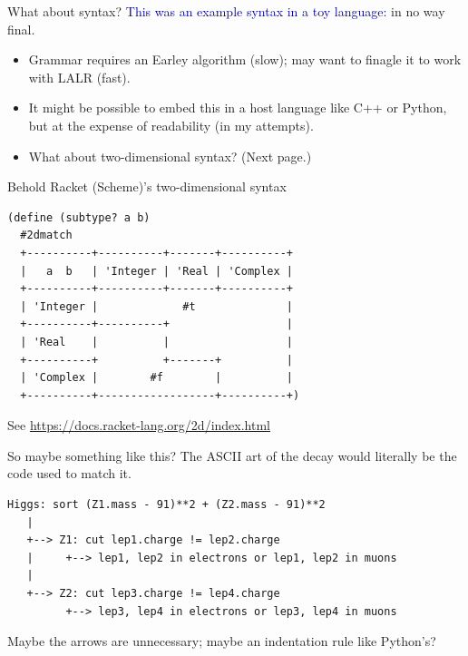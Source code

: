 \documentclass[aspectratio=169]{beamer}
\begin{document}
\begin{frame}{What about syntax?}
\Large
\vspace{0.5 cm}
\textcolor{darkblue}{This was an example syntax in a toy language:} in no way final.

\large
\vspace{0.5 cm}
\begin{itemize}\setlength{\itemsep}{0.5 cm}
\item Grammar requires an Earley algorithm (slow); may want to finagle it to work with LALR (fast).
\item It might be possible to embed this in a host language like C++ or Python, but at the expense of readability (in my attempts).
\item What about two-dimensional syntax? (Next page.)
\end{itemize}
\end{frame}

\begin{frame}[fragile]{Behold Racket (Scheme)'s two-dimensional syntax}
\normalsize
\vspace{0.5 cm}

\begin{center}
\begin{minipage}{0.8\linewidth}
\begin{verbatim}
(define (subtype? a b)
  #2dmatch
  +----------+----------+-------+----------+
  |   a  b   | 'Integer | 'Real | 'Complex |
  +----------+----------+-------+----------+
  | 'Integer |             #t              |
  +----------+----------+                  |
  | 'Real    |          |                  |
  +----------+          +-------+          |
  | 'Complex |        #f        |          |
  +----------+------------------+----------+)
\end{verbatim}
\end{minipage}
\end{center}

\vspace{0.25 cm}
\small \hfill See \textcolor{blue}{\url{https://docs.racket-lang.org/2d/index.html}}
\end{frame}

\begin{frame}[fragile]{So maybe something like this?}
\large
\vspace{0.25 cm}
The ASCII art of the decay would literally be the code used to match it.

\normalsize
\vspace{0.5 cm}
\begin{Verbatim}[commandchars=\\\{\}]
Higgs: sort (Z1.mass - 91)**2 + (Z2.mass - 91)**2
   |
   +--> Z1: cut lep1.charge != lep2.charge
   |     +--> lep1, lep2 in electrons or lep1, lep2 in muons
   |
   +--> Z2: cut lep3.charge != lep4.charge
         +--> lep3, lep4 in electrons or lep3, lep4 in muons
\end{Verbatim}

\large
\vspace{0.5 cm}
Maybe the arrows are unnecessary; maybe an indentation rule like Python's?
\end{frame}
\end{document}
